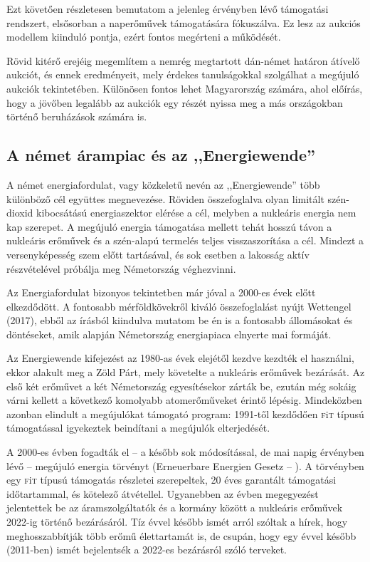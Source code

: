 \documentclass[twoside, magyar, showtrims]{corvinusphd}
\theoremstyle{plain}
\theoremstyle{remark}
\theoremstyle{definition}
\newcommand{\fit}{\textsc{f}i\textsc{t}\index{\textsc{f}i\textsc{t}} }
\begin{document}
Ezt követően részletesen bemutatom a jelenleg
érvényben lévő támogatási rendszert,
elsősorban a naperőművek támogatására fókuszálva.
Ez lesz az aukciós modellem kiinduló pontja,
ezért fontos megérteni a működését.

Rövid kitérő erejéig megemlítem a nemrég megtartott
dán-német határon átívelő aukciót, és ennek eredményeit,
mely érdekes tanulságokkal szolgálhat
a megújuló aukciók tekintetében. Különösen
fontos lehet Magyarország számára, 
ahol előírás, hogy a jövőben legalább 
az aukciók egy részét nyissa meg a más
országokban történő beruházások számára is.

\subsection{A német árampiac és az ,,Energiewende''}

A német energiafordulat, vagy közkeletű nevén az ,,Energiewende''
több különböző cél együttes megnevezése.
Röviden összefoglalva olyan limitált szén-dioxid kibocsátású
energiaszektor elérése a cél, melyben a nukleáris energia nem kap szerepet.
A megújuló energia támogatása mellett tehát hosszú távon
a nukleáris erőművek és a szén-alapú termelés teljes visszaszorítása a cél.
Mindezt a versenyképesség szem előtt tartásával, és sok esetben
a lakosság aktív részvételével próbálja meg Németország véghezvinni.

Az Energiafordulat bizonyos tekintetben
már jóval a 2000-es évek előtt elkezdődött.
A fontosabb mérföldkövekről kiváló összefoglalást nyújt
Wettengel (2017), ebből az írásból kiindulva mutatom be én is a fontosabb
állomásokat és döntéseket, amik alapján Németország energiapiaca
elnyerte mai formáját.

Az Energiewende kifejezést az 1980-as évek elejétől
kezdve kezdték el használni,
ekkor alakult meg a Zöld Párt, mely követelte
a nukleáris erőművek bezárását.
Az első két erőművet a két Németország
egyesítésekor zárták be,
ezután még sokáig várni kellett a következő
komolyabb atomerőműveket érintő lépésig.
Mindeközben azonban elindult a megújulókat támogató program:
1991-től kezdődően \fit típusú támogatással igyekeztek
beindítani a megújulók elterjedését.

A 2000-es évben fogadták el -- a később sok
módosítással, de mai napig érvényben lévő -- 
megújuló energia törvényt (Erneuerbare Energien Gesetz -- ).
A törvényben egy \fit típusú támogatás részletei
szerepeltek, 20 éves garantált támogatási
időtartammal, és kötelező átvétellel.
Ugyanebben az évben megegyezést jelentettek
be az áramszolgáltatók és a kormány között
a nukleáris erőművek 2022-ig történő bezárásáról.
Tíz évvel később ismét arról szóltak a hírek,
hogy meghosszabbítják több erőmű élettartamát
is, de csupán, hogy  egy évvel később (2011-ben)
ismét bejelentsék a 2022-es bezárásról szóló terveket.
\end{document}
